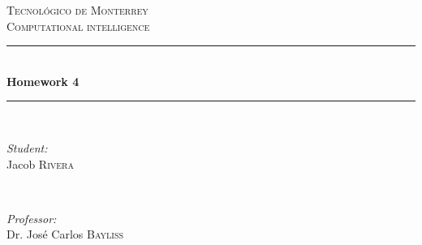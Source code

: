 \documentclass{article}
\begin{document}
\begin{titlepage}

    \newcommand{\HRule}{\rule{\linewidth}{0.5mm}} %

    \center %


    \textsc{\LARGE Tecnológico de Monterrey}\\[1.5cm] %
    \textsc{\Large Computational intelligence}\\[0.5cm] %


    \HRule \\[0.4cm]
    { \huge \bfseries Homework 4}\\[0.4cm] %
    \HRule \\[1.5cm]


    \begin{minipage}{0.4\textwidth}
    \begin{flushleft} \large
    \emph{Student:}\\
    Jacob \textsc{Rivera} %
    \end{flushleft}
    \end{minipage}
    ~
    \begin{minipage}{0.4\textwidth}
    \begin{flushright} \large
    \emph{Professor:} \\
    Dr. José Carlos \textsc{Bayliss} %
    \end{flushright}
    \end{minipage}\\[2cm]


\end{titlepage}
\end{document}
